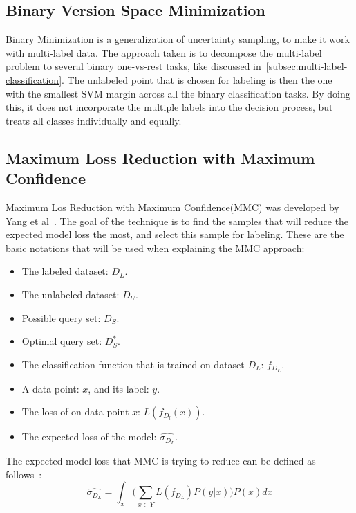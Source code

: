 \subsection{Binary Version Space Minimization}\label{subsec:binmin}

Binary Minimization is a generalization of uncertainty sampling, to make it work with multi-label data.
The approach taken is to decompose the multi-label problem to several binary one-vs-rest tasks, like discussed in~\ref{subsec:multi-label-classification}.
The unlabeled point that is chosen for labeling is then the one with the smallest SVM margin across all the binary classification tasks.
By doing this, it does not incorporate the multiple labels into the decision process, but treats all classes individually and equally. 

\subsection{Maximum Loss Reduction with Maximum Confidence}\label{subsec:mmc}

Maximum Los Reduction with Maximum Confidence(MMC) was developed by Yang et al~\cite{yang2009effective}.
The goal of the technique is to find the samples that will reduce the expected model loss the most, and select this sample for labeling.
These are the basic notations that will be used when explaining the MMC approach:
\begin{itemize}
    \item The labeled dataset: $D_L$.
    \item The unlabeled dataset: $D_U$.
    \item Possible query set: $D_S$.
    \item Optimal query set: $D^*_S$.
    \item The classification function that is trained on dataset $D_L$: $f_{D_L}$.
    \item A data point: $x$, and its label: $y$.
    \item The loss of on data point $x$: $L(f_{D_l}(x))$.
    \item The expected loss of the model: $\widehat{\sigma_{D_L}}$.
\end{itemize}

The expected model loss that MMC is trying to reduce can be defined as follows~\cite{yang2009effective}:
\begin{equation}
    \widehat{\sigma_{D_L}} = \int_x \bigg ( \sum_{x \in Y} L(f_{D_L})P(y|x) \bigg ) P(x)dx
\end{equation}

